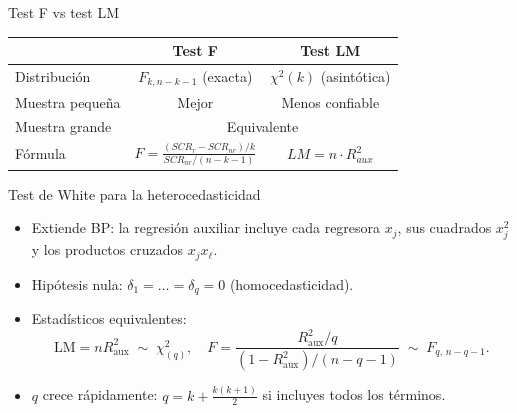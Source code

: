 \documentclass{beamer}
\begin{document}
\begin{frame}{Test F vs test LM}
    
\begin{table}[h]
\centering
\begin{tabular}{lcc}
\toprule
& \textbf{Test F} & \textbf{Test LM} \\
\midrule
Distribución & $F_{k, n-k-1}$ (exacta) & $\chi^2(k)$ (asintótica) \\
Muestra pequeña & Mejor & Menos confiable \\
 Muestra grande & \multicolumn{2}{c}{Equivalente} \\
Fórmula & $F = \frac{(SCR_r - SCR_{nr})/k}{SCR_{nr}/(n-k-1)}$ & $LM = n \cdot R^2_{aux}$ \\
\bottomrule
\end{tabular}
\end{table}
\end{frame}

\begin{frame}{Test de White para la heterocedasticidad}
\begin{itemize}
  \item Extiende BP: la regresión auxiliar incluye cada regresora $x_j$, sus cuadrados $x_j^{2}$ y los productos cruzados $x_jx_{\ell}$.
  \item Hipótesis nula: $\delta_1=\dots=\delta_q=0$ (homocedasticidad).
  \item Estadísticos equivalentes:
  \[
    \text{LM}=nR_{\text{aux}}^{2}\;\sim\;\chi^{2}_{(q)},\quad
    F=\frac{R_{\text{aux}}^{2}/q}{(1-R_{\text{aux}}^{2})/(n-q-1)}\;\sim\;F_{q,\,n-q-1}.
  \]
  \item $q$ crece rápidamente: $q=k+\tfrac{k(k+1)}{2}$ si incluyes todos los términos.
\end{itemize}
\end{frame}
\end{document}
